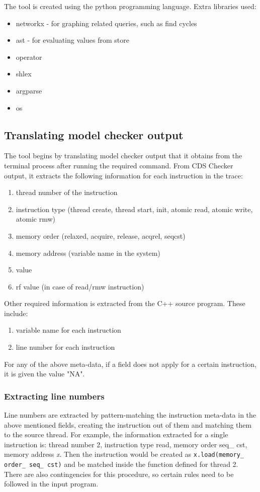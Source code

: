 \par
The tool is created using the python programming language. Extra libraries used:
\begin{itemize}
	\item networkx - for graphing related queries, such as find cycles
	\item ast - for evaluating values from store
	\item operator
	\item shlex
	\item argparse
	\item os
\end{itemize}

\subsection{Translating model checker output}
The tool begins by translating model checker output that it obtains from the terminal process after running the required command. From CDS Checker output, it extracts the following information for each instruction in the trace:
\begin{enumerate}
	\item thread number of the instruction
	\item instruction type (thread create, thread start, init, atomic read, atomic write, atomic rmw)
	\item memory order (relaxed, acquire, release, acq\textunderscore rel, seq\textunderscore cst)
	\item memory address (variable name in the system)
	\item value
	\item rf value (in case of read/rmw instruction)
\end{enumerate}

\par 
Other required information is extracted from the C++ source program. These include:
\begin{enumerate}[7.]
	\item variable name for each instruction
	\item line number for each instruction
\end{enumerate}

\par
For any of the above meta-data, if a field does not apply for a certain instruction, it is given the value "NA".

\subsubsection{Extracting line numbers}
Line numbers are extracted by pattern-matching the instruction meta-data in the above mentioned fields, creating the instruction out of them and matching them to the source thread. For example, the information extracted for a single instruction is: thread number 2, instruction type read, memory order seq\_ cst, memory address \textit{x}. Then the instruction would be created as \texttt{x.load(memory\_ order\_ seq\_ cst)} and be matched inside the function defined for thread 2. There are also contingencies for this procedure, so certain rules need to be followed in the input program.

